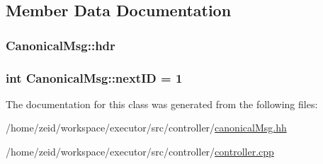 \subsection{Member Data Documentation}
\hypertarget{class_canonical_msg_afce1fd35cf068067b013162e2b624b64}{
\subsubsection[{hdr}]{ {\bf CanonicalMsg::hdr}}}
\label{class_canonical_msg_afce1fd35cf068067b013162e2b624b64}
\hypertarget{class_canonical_msg_a2fc5e5c814ce88032683695e88b5f8f1}{
\subsubsection[{nextID}]{\setlength{\rightskip}{0pt plus 5cm}int {\bf CanonicalMsg::nextID} = 1}}
\label{class_canonical_msg_a2fc5e5c814ce88032683695e88b5f8f1}


The documentation for this class was generated from the following files:\begin{DoxyCompactItemize}
\item 
/home/zeid/workspace/executor/src/controller/\hyperlink{canonical_msg_8hh}{canonicalMsg.hh}\item 
/home/zeid/workspace/executor/src/controller/\hyperlink{controller_8cpp}{controller.cpp}\end{DoxyCompactItemize}
